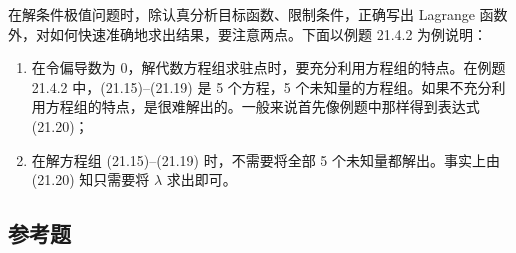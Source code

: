 在解条件极值问题时，除认真分析目标函数、限制条件，正确写出 Lagrange 函数外，对如何快速准确地求出结果，要注意两点。下面以例题 21.4.2 为例说明：
\begin{enumerate}[label=(\arabic*)]
  \item 在令偏导数为 $0$，解代数方程组求驻点时，要充分利用方程组的特点。在例题 21.4.2 中，(21.15)--(21.19) 是 5 个方程，5 个未知量的方程组。如果不充分利用方程组的特点，是很难解出的。一般来说首先像例题中那样得到表达式 (21.20)；
  \item 在解方程组 (21.15)--(21.19) 时，不需要将全部 5 个未知量都解出。事实上由 (21.20) 知只需要将 $\lambda$ 求出即可。
\end{enumerate}

\subsection{参考题}

